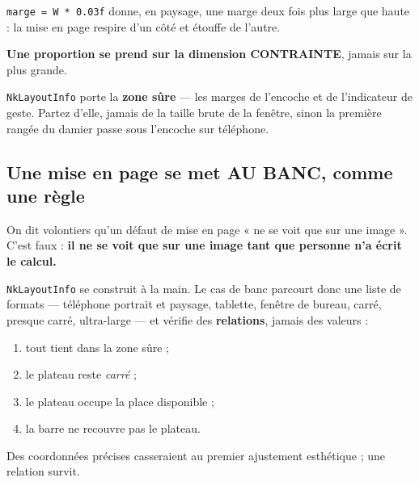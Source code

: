 \begin{nkretenir}
\texttt{marge = W * 0.03f} donne, en paysage, une marge deux fois plus large que
haute : la mise en page respire d'un côté et étouffe de l'autre.

\textbf{Une proportion se prend sur la dimension CONTRAINTE}, jamais sur la plus
grande.
\end{nkretenir}

\begin{nkretenir}
\texttt{NkLayoutInfo} porte la \textbf{zone sûre} --- les marges de l'encoche et
de l'indicateur de geste. Partez d'elle, jamais de la taille brute de la fenêtre,
sinon la première rangée du damier passe sous l'encoche sur téléphone.
\end{nkretenir}

\subsection{Une mise en page se met AU BANC, comme une règle}

On dit volontiers qu'un défaut de mise en page « ne se voit que sur une image ».
C'est faux : \textbf{il ne se voit que sur une image tant que personne n'a écrit
le calcul.}

\begin{nkretenir}
\texttt{NkLayoutInfo} se construit à la main. Le cas de banc parcourt donc une
liste de formats --- téléphone portrait et paysage, tablette, fenêtre de bureau,
carré, presque carré, ultra-large --- et vérifie des \textbf{relations}, jamais
des valeurs :

\begin{enumerate}
\item tout tient dans la zone sûre ;
\item le plateau reste \emph{carré} ;
\item le plateau occupe la place disponible ;
\item la barre ne recouvre pas le plateau.
\end{enumerate}

Des coordonnées précises casseraient au premier ajustement esthétique ; une
relation survit.
\end{nkretenir}

